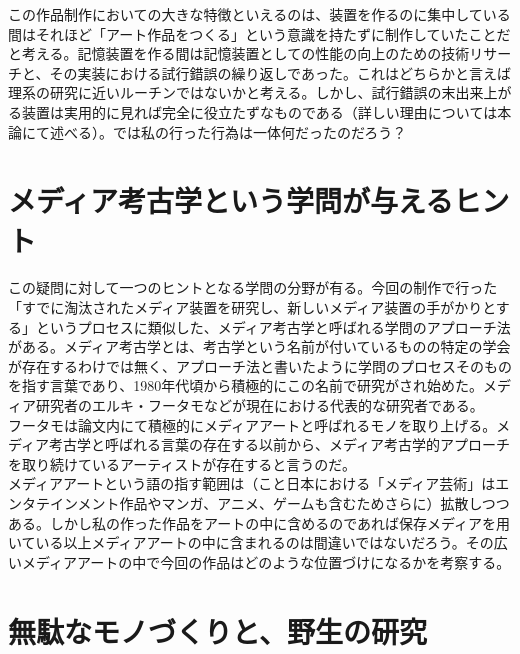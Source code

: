 この作品制作においての大きな特徴といえるのは、装置を作るのに集中している間はそれほど「アート作品をつくる」という意識を持たずに制作していたことだと考える。記憶装置を作る間は記憶装置としての性能の向上のための技術リサーチと、その実装における試行錯誤の繰り返しであった。これはどちらかと言えば理系の研究に近いルーチンではないかと考える。しかし、試行錯誤の末出来上がる装置は実用的に見れば完全に役立たずなものである（詳しい理由については本論にて述べる）。では私の行った行為は一体何だったのだろう？

\section{メディア考古学という学問が与えるヒント}\label{ux30e1ux30c7ux30a3ux30a2ux8003ux53e4ux5b66ux3068ux3044ux3046ux5b66ux554fux304cux4e0eux3048ux308bux30d2ux30f3ux30c8}

この疑問に対して一つのヒントとなる学問の分野が有る。今回の制作で行った「すでに淘汰されたメディア装置を研究し、新しいメディア装置の手がかりとする」というプロセスに類似した、メディア考古学と呼ばれる学問のアプローチ法がある。メディア考古学とは、考古学という名前が付いているものの特定の学会が存在するわけでは無く、アプローチ法と書いたように学問のプロセスそのものを指す言葉であり、1980年代頃から積極的にこの名前で研究がされ始めた。メディア研究者のエルキ・フータモなどが現在における代表的な研究者である。\\
フータモは論文内にて積極的にメディアアートと呼ばれるモノを取り上げる。メディア考古学と呼ばれる言葉の存在する以前から、メディア考古学的アプローチを取り続けているアーティストが存在すると言うのだ。\\
メディアアートという語の指す範囲は（こと日本における「メディア芸術」はエンタテインメント作品やマンガ、アニメ、ゲームも含むためさらに）拡散しつつある。しかし私の作った作品をアートの中に含めるのであれば保存メディアを用いている以上メディアアートの中に含まれるのは間違いではないだろう。その広いメディアアートの中で今回の作品はどのような位置づけになるかを考察する。\\

\section{無駄なモノづくりと、野生の研究}\label{ux7121ux99c4ux306aux30e2ux30ceux3065ux304fux308aux3068ux91ceux751fux306eux7814ux7a76}


